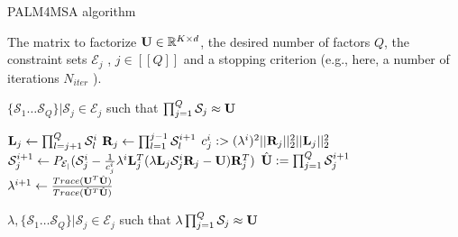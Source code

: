 \begin{algorithm}
\caption{PALM4MSA algorithm}
\label{algo:palm4msa}
\begin{algorithmic}[1]


\REQUIRE The matrix to factorize ${\mathbf{U}} \in \mathbb{R}^{K \times d}$, the desired number of factors $Q$, the constraint sets $\mathcal{E}_j$ , $j \in [\![Q]\!]$ and a stopping criterion (e.g., here, a number of iterations $N_{iter}$ ).

\ENSURE $\{\mathcal{S}_1 \dots \mathcal{S}_{Q}\}|\mathcal{S}_j \in \mathcal{E}_j$ such that $\prod_{j=1}^{Q}\mathcal{S}_j \approx {\mathbf{U}}$

\STATE  ${\mathbf{L}}_j \leftarrow \prod_{l=j+1}^{Q} \mathcal{S}_{l}^{i}$
\STATE  ${\mathbf{R}}_j \leftarrow \prod_{l=1}^{j-1} \mathcal{S}_{l}^{i+1}$
\STATE $c_j^i :> (\lambda^i)^2 ||{\mathbf{R}}_j||_2^2 ||{\mathbf{L}}_j||_2^2$
\STATE $\mathcal{S}^{i+1}_j \leftarrow P_{\mathcal{E_j}}(\mathcal{S}_j^i - \frac{1}{c_j^i} \lambda^i {\mathbf{L}}_j^T(\lambda {\mathbf{L}}_j \mathcal{S}_j^i {\mathbf{R}}_j - {\mathbf{U}}){\mathbf{R}}_j^T)$
\ENDFOR
\STATE $\hat {{\mathbf{U}}} := \prod_{j=1}^{Q} \mathcal{S}_j^{i+1}$
\STATE $\lambda^{i+1} \leftarrow \frac{Trace({\mathbf{U}}^T\hat{{\mathbf{U}}})}{Trace(\hat{{\mathbf{U}}}^T\hat{{\mathbf{U}}})}$
\ENDFOR

\ENSURE $\lambda, \{\mathcal{S}_1 \dots \mathcal{S}_{Q}\}|\mathcal{S}_j \in \mathcal{E}_j$ such that $\lambda \prod_{j=1}^{Q}\mathcal{S}_j \approx {\mathbf{U}}$

\end{algorithmic}
\end{algorithm}



%
%
%

